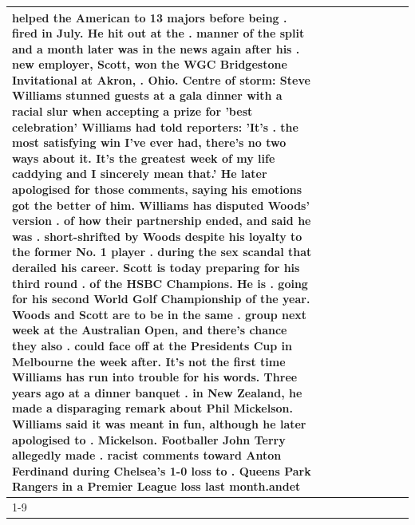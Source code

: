 \begin{table}[H]
\begin{tabular}{lllrlllll}
helped the American to 13 majors before being . fired in July. He hit out at the . manner of the split and a month later was in the news again after his . new employer, Scott, won the WGC Bridgestone Invitational at Akron, . Ohio. Centre of storm: Steve Williams stunned guests at a gala dinner with a racial slur when accepting a prize for 'best celebration' Williams had told reporters: 'It's . the most satisfying win I've ever had, there's no two ways about it. It's the greatest week of my life caddying and I sincerely mean that.' He later apologised for those comments, saying his emotions got the better of him. Williams has disputed Woods' version . of how their partnership ended, and said he was . short-shrifted by Woods despite his loyalty to the former No. 1 player . during the sex scandal that derailed his career. Scott is today preparing for his third round . of the HSBC Champions. He is . going for his second World Golf Championship of the year. Woods and Scott are to be in the same . group next week at the Australian Open, and there's chance they also . could face off at the Presidents Cup in Melbourne the week after. It's not the first time Williams has run into trouble for his words. Three years ago at a dinner banquet . in New Zealand, he made a disparaging remark about Phil Mickelson. Williams said it was meant in fun, although he later apologised to . Mickelson. Footballer John Terry allegedly made . racist comments toward Anton Ferdinand during Chelsea's 1-0 loss to . Queens Park Rangers in a Premier League loss last month.andet \\
\cline{1-9}

\end{tabular}
\end{table}

